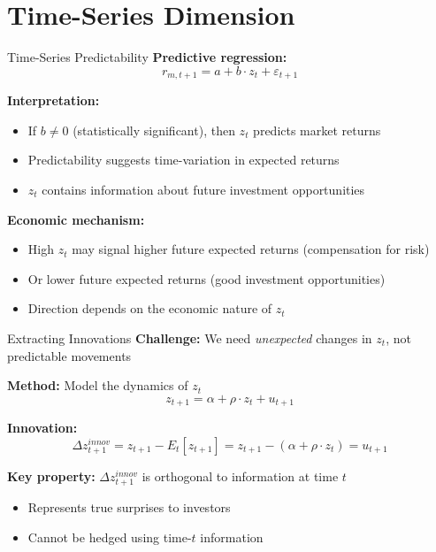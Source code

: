 \documentclass{beamer}
\begin{document}
\section{Time-Series Dimension}

\begin{frame}{Time-Series Predictability}
\textbf{Predictive regression:}
$$r_{m,t+1} = a + b \cdot z_t + \varepsilon_{t+1}$$

\vspace{0.3cm}
\textbf{Interpretation:}
\begin{itemize}
\item If $b \neq 0$ (statistically significant), then $z_t$ predicts market returns
\item Predictability suggests time-variation in expected returns
\item $z_t$ contains information about future investment opportunities
\end{itemize}

\vspace{0.3cm}
\textbf{Economic mechanism:}
\begin{itemize}
\item High $z_t$ may signal higher future expected returns (compensation for risk)
\item Or lower future expected returns (good investment opportunities)
\item Direction depends on the economic nature of $z_t$
\end{itemize}
\end{frame}

\begin{frame}{Extracting Innovations}
\textbf{Challenge:} We need \textit{unexpected} changes in $z_t$, not predictable movements

\vspace{0.3cm}
\textbf{Method:} Model the dynamics of $z_t$
$$z_{t+1} = \alpha + \rho \cdot z_t + u_{t+1}$$

\vspace{0.3cm}
\textbf{Innovation:}
$$\Delta z_{t+1}^{innov} = z_{t+1} - E_t[z_{t+1}] = z_{t+1} - (\alpha + \rho \cdot z_t) = u_{t+1}$$

\vspace{0.3cm}
\textbf{Key property:} $\Delta z_{t+1}^{innov}$ is orthogonal to information at time $t$
\begin{itemize}
\item Represents true surprises to investors
\item Cannot be hedged using time-$t$ information
\end{itemize}
\end{frame}
\end{document}
